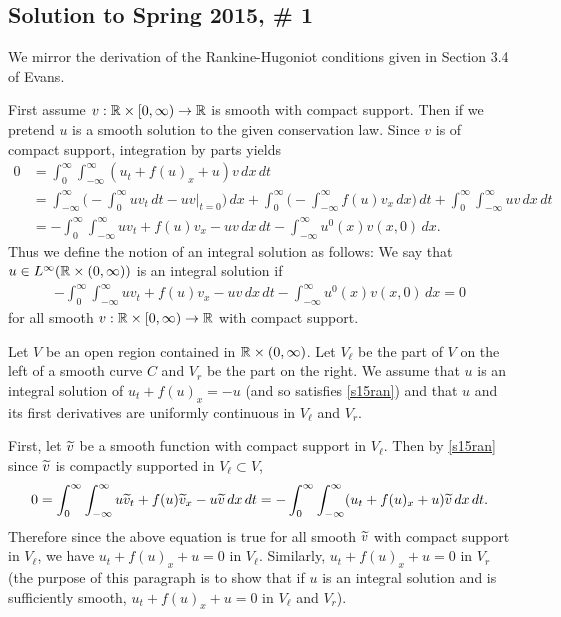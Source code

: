 \subsection*{Solution to Spring 2015, \# 1}\label{s151}
We mirror the derivation of the Rankine-Hugoniot conditions given in Section 3.4 of Evans.

First assume $v: \mathbb{R} \times [0, \infty) \rightarrow \mathbb{R}$ is smooth with compact support. Then if we pretend
$u$ is a smooth solution to the given conservation law. Since $v$ is of compact support, integration by parts yields
\begin{align*}
0 &= \int_{0}^{\infty}\int_{-\infty}^{\infty}(u_{t} + f(u)_{x} + u)v\, dx\, dt\\
 &= \int_{-\infty}^{\infty}\bigg(-\int_{0}^{\infty}uv_{t}\, dt - uv|_{t = 0}\bigg)\, dx + \int_{0}^{\infty}\bigg(-\int_{-\infty}^{\infty}f(u)v_{x}\, dx\bigg)\, dt + \int_{0}^{\infty}\int_{-\infty}^{\infty}uv\, dx\, dt\\
 &= -\int_{0}^{\infty}\int_{-\infty}^{\infty}uv_{t} + f(u)v_{x} - uv\, dx\, dt - \int_{-\infty}^{\infty}u^{0}(x)v(x, 0)\, dx.
\end{align*}
Thus we define the notion of an integral solution as follows: We say that $u \in L^{\infty}(\mathbb{R} \times (0, \infty))$ is an integral solution
if
\begin{align}\label{s15ran}
-\int_{0}^{\infty}\int_{-\infty}^{\infty}uv_{t} + f(u)v_{x} - uv\, dx\, dt - \int_{-\infty}^{\infty}u^{0}(x)v(x, 0)\, dx = 0
\end{align}
for all smooth $v: \mathbb{R} \times [0, \infty) \rightarrow \mathbb{R}$ with compact support.

Let $V$ be an open region contained in $\mathbb{R} \times (0, \infty)$. Let $V_{\ell}$ be the part of $V$ on the left of a smooth curve $C$
and $V_{r}$ be the part on the right. We assume that $u$ is an integral solution of $u_{t} + f(u)_{x} = -u$ (and so satisfies \eqref{s15ran}) and that
$u$ and its first derivatives are uniformly continuous in $V_{\ell}$ and $V_{r}$.

First, let $\widetilde{v}$ be a smooth function with compact support in $V_{\ell}$. Then by \eqref{s15ran} since $\widetilde{v}$ is compactly supported in $V_{\ell} \subset V$,
\begin{align*}
0 = \int_{0}^{\infty}\int_{-\infty}^{\infty}u\widetilde{v}_{t} + f(u)\widetilde{v}_{x} - u\widetilde{v}\, dx\, dt = -\int_{0}^{\infty}\int_{-\infty}^{\infty}(u_{t} + f(u)_{x} + u)\widetilde{v}\, dx\, dt.
\end{align*}
Therefore since the above equation is true for all smooth $\widetilde{v}$ with compact support in $V_{\ell}$, we have
$u_{t} + f(u)_{x} + u = 0$ in $V_{\ell}$. Similarly, $u_{t} + f(u)_{x} + u = 0$ in $V_{r}$
(the purpose of this paragraph is to show that if $u$ is an integral solution and is sufficiently smooth,
$u_{t} + f(u)_{x} + u = 0$ in $V_{\ell}$ and $V_{r}$).


